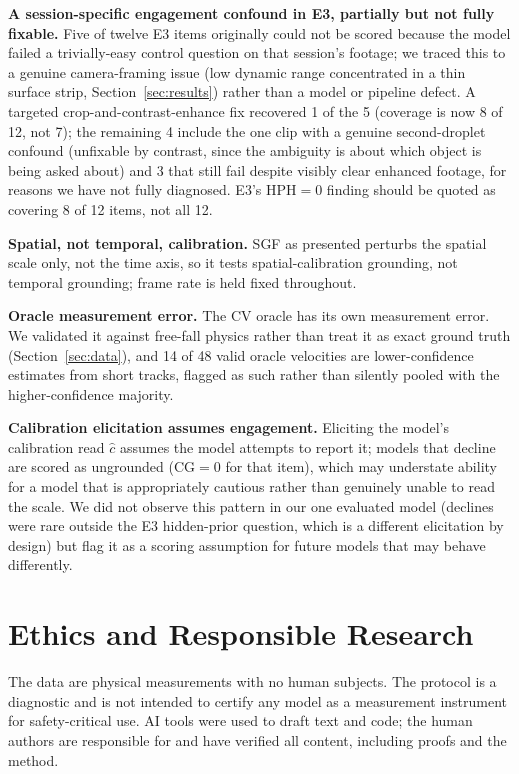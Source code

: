\documentclass[11pt]{article}
\newcommand{\cg}{\mathrm{CG}}
\newcommand{\hph}{\mathrm{HPH}}
\begin{document}
\noindent\textbf{A session-specific engagement confound in E3, partially but
not fully fixable.} Five of twelve E3 items originally could not be scored
because the model failed a trivially-easy control question on that session's
footage; we traced this to a genuine camera-framing issue (low dynamic range
concentrated in a thin surface strip, Section~\ref{sec:results}) rather than a
model or pipeline defect. A targeted crop-and-contrast-enhance fix recovered 1
of the 5 (coverage is now 8 of 12, not 7); the remaining 4 include the one
clip with a genuine second-droplet confound (unfixable by contrast, since the
ambiguity is about which object is being asked about) and 3 that still fail
despite visibly clear enhanced footage, for reasons we have not fully
diagnosed. E3's $\hph{=}0$ finding should be quoted as covering 8 of 12 items,
not all 12.

\noindent\textbf{Spatial, not temporal, calibration.} SGF as presented perturbs
the spatial scale only, not the time axis, so it tests spatial-calibration
grounding, not temporal grounding; frame rate is held fixed throughout.

\noindent\textbf{Oracle measurement error.} The CV oracle has its own
measurement error. We validated it against free-fall physics rather than treat
it as exact ground truth (Section~\ref{sec:data}), and 14 of 48 valid oracle
velocities are lower-confidence estimates from short tracks, flagged as such
rather than silently pooled with the higher-confidence majority.

\noindent\textbf{Calibration elicitation assumes engagement.} Eliciting the
model's calibration read $\hat c$ assumes the model attempts to report it;
models that decline are scored as ungrounded ($\cg{=}0$ for that item), which
may understate ability for a model that is appropriately cautious rather than
genuinely unable to read the scale. We did not observe this pattern in our one
evaluated model (declines were rare outside the E3 hidden-prior question, which
is a different elicitation by design) but flag it as a scoring assumption for
future models that may behave differently.

\section{Ethics and Responsible Research}
The data are physical measurements with no human subjects. The protocol is a
diagnostic and is not intended to certify any model as a measurement instrument
for safety-critical use. AI tools were used to draft text and code; the human
authors are responsible for and have verified all content, including proofs and
the method.



\end{document}
